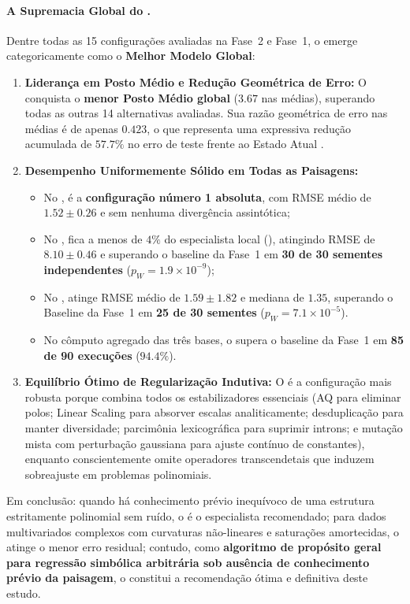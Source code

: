 \paragraph{A Supremacia Global do .}
Dentre todas as 15 configurações avaliadas na Fase~2 e Fase~1, o \textbf{}
emerge categoricamente como o \textbf{Melhor Modelo Global}:
\begin{enumerate}
  \item \textbf{Liderança em Posto Médio e Redução Geométrica de Erro:}
        O  conquista o \textbf{menor Posto Médio global} ($\mathbf{3.67}$ nas
        médias), superando todas as outras 14 alternativas avaliadas. Sua razão
        geométrica de erro nas médias é de apenas $\mathbf{0.423}$, o que representa
        uma expressiva redução acumulada de \textbf{$57.7\%$} no erro de teste frente
        ao Estado Atual .
  \item \textbf{Desempenho Uniformemente Sólido em Todas as Paisagens:}
        \begin{itemize}
          \item No , é a \textbf{configuração número 1 absoluta},
                com RMSE médio de $1.52 \pm 0.26$ e sem nenhuma divergência assintótica;
          \item No , fica a menos de $4\%$ do especialista local
                (), atingindo RMSE de $8.10 \pm 0.46$ e superando o baseline
                da Fase~1 em \textbf{30 de 30 sementes independentes} ($p_W = 1.9\times10^{-9}$);
          \item No , atinge RMSE médio de $1.59 \pm 1.82$ e mediana de $1.35$,
                superando o Baseline da Fase~1 em \textbf{25 de 30 sementes} ($p_W = 7.1\times10^{-5}$).
          \item No cômputo agregado das três bases, o  supera o baseline da
                Fase~1 em \textbf{85 de 90 execuções} ($94.4\%$).
        \end{itemize}
  \item \textbf{Equilíbrio Ótimo de Regularização Indutiva:}
        O  é a configuração mais robusta porque combina todos os
        estabilizadores essenciais (AQ para eliminar polos; Linear Scaling para absorver
        escalas analiticamente; desduplicação para manter diversidade; parcimônia
        lexicográfica para suprimir introns; e mutação mista com perturbação gaussiana
        para ajuste contínuo de constantes), enquanto conscientemente omite operadores
        transcendetais que induzem sobreajuste em problemas polinomiais.
\end{enumerate}

Em conclusão: quando há conhecimento prévio inequívoco de uma estrutura estritamente
polinomial sem ruído, o  é o especialista recomendado; para dados
multivariados complexos com curvaturas não-lineares e saturações amortecidas, o
 atinge o menor erro residual; contudo, como \textbf{algoritmo de propósito
geral para regressão simbólica arbitrária sob ausência de conhecimento prévio da paisagem},
o \textbf{} constitui a recomendação ótima e definitiva deste estudo.
